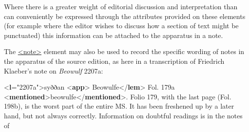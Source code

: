 Where there is a greater weight of editorial discussion and interpretation than can conveniently be expressed through the attributes provided on these elements (for example where the editor wishes to discuss how a section of text might be punctuated) this information can be attached to the apparatus in a note.\par
The \hyperref[TEI.note]{<note>} element may also be used to record the specific wording of notes in the apparatus of the source edition, as here in a transcription of Friedrich Klaeber's note on \textit{Beowulf} 2207a: \par\bgroup{}\exampleFont \begin{shaded}\noindent\mbox{}{<\textbf{l}\hspace*{1em}{n}="{2207a}">}syððan {<\textbf{app}>}\mbox{}\newline 
\hspace*{1em}Beowulfe{</\textbf{lem}>}\mbox{}\newline 
\hspace*{1em}Fol. 179a {<\textbf{mentioned}>}beowulfe{</\textbf{mentioned}>}.\mbox{}\newline 
\hspace*{1em}\hspace*{1em}\hspace*{1em}\hspace*{1em} Folio 179, with the last page (Fol. 198b), is the worst part of the\mbox{}\newline 
\hspace*{1em}\hspace*{1em}\hspace*{1em}\hspace*{1em} entire MS. It has been freshened up by a later hand, but not always\mbox{}\newline 
\hspace*{1em}\hspace*{1em}\hspace*{1em}\hspace*{1em} correctly. Information on doubtful readings is in the notes of\mbox{}\newline 

\end{shaded}
